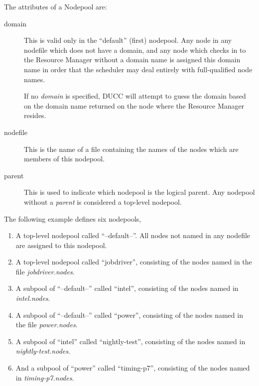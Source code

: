     The attributes of a Nodepool are:
    \begin{description}
      \item[domain] This is valid only in the ``default'' (first) nodepool.  Any node
        in any nodefile which does not have a domain, and any node which checks
        in to the Resource Manager without a domain name is assigned this domain name
        in order that the scheduler may deal entirely with full-qualified node names.

        If no {\em domain} is specified, DUCC will attempt to guess the domain based
        on the domain name returned on the node where the Resource Manager resides.

      \item[nodefile] This is the name of a file containing the names of the nodes
        which are members of this nodepool.

      \item[parent] This is used to indicate which nodepool is the logical parent.
        Any nodepool without a {\em parent} is considered a top-level nodepool.
    \end{description}
        
    The following example defines six nodepools, 
    \begin{enumerate}
      \item A top-level nodepool called ``--default--''.  All nodes not named
        in any nodefile are assigned to this nodepool.
      \item A top-level nodepool called ``jobdriver'', consisting of the nodes
        named in the file {\em jobdriver.nodes}.
      \item A subpool of ``--default--'' called ``intel'', consisting of the
        nodes named in {\em intel.nodes}.
      \item A subpool of ``--default--'' called ``power'', consisting of the
        nodes named in the file {\em power.nodes}.
      \item A subpool of ``intel'' called ``nightly-test'', consisting of the 
        nodes named in {\em nightly-test.nodes}.
      \item And a subpool of ``power'' called ``timing-p7'', consisting of the
        nodes named in {\em timing-p7.nodes}.
    \end{enumerate}

